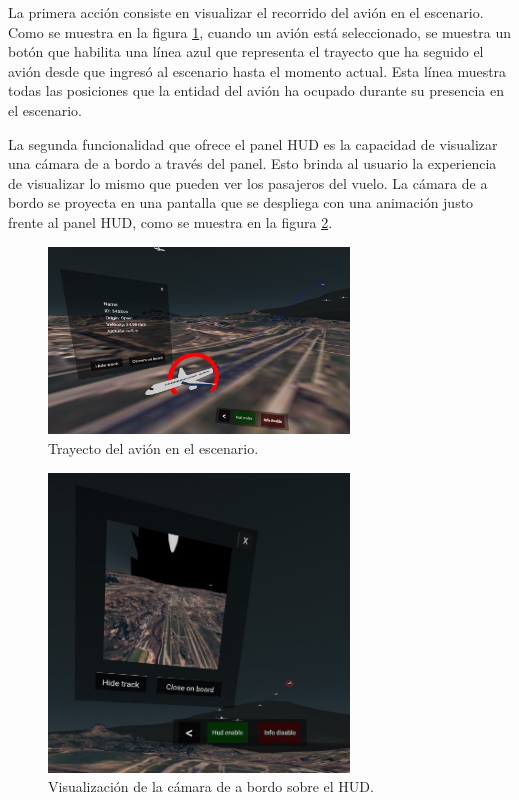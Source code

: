 \documentclass[a4paper, 11pt]{book}
\begin{document}
La primera acción consiste en visualizar el recorrido del avión en el escenario. Como se muestra en la figura \ref{fig:showTrack}, cuando un avión está seleccionado, se muestra un botón que habilita una línea azul que representa el trayecto que ha seguido el avión desde que ingresó al escenario hasta el momento actual. Esta línea muestra todas las posiciones que la entidad del avión ha ocupado durante su presencia en el escenario.

La segunda funcionalidad que ofrece el panel \textsc{HUD} es la capacidad de visualizar una cámara de a bordo a través del panel. Esto brinda al usuario la experiencia de visualizar lo mismo que pueden ver los pasajeros del vuelo. La cámara de a bordo se proyecta en una pantalla que se despliega con una animación justo frente al panel \textsc{HUD}, como se muestra en la figura \ref{fig:cameraOnBoard}.\\
\begin{figure}[h]
	\centering
	\includegraphics[width=8cm, keepaspectratio]{img/show_track.jpg}
	\caption{Trayecto del avión en el escenario.}
	\label{fig:showTrack}
\end{figure}
\begin{figure}[h]
  \centering
  \includegraphics[width=8cm, keepaspectratio]{img/cameraOnBoard.jpg}
  \caption{Visualización de la cámara de a bordo sobre el HUD.}
  \label{fig:cameraOnBoard}
\end{figure}
\end{document}
